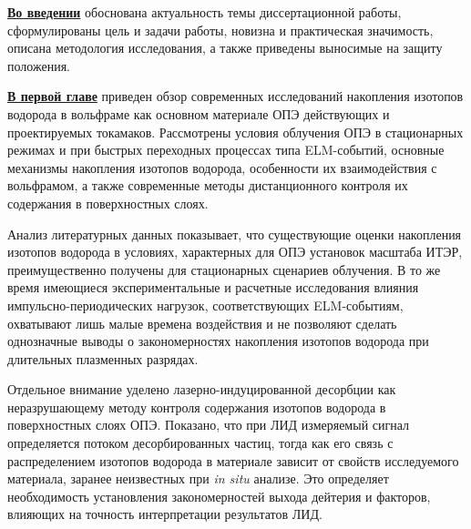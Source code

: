 \underline{\textbf{Во введении}} обоснована актуальность темы диссертационной работы, сформулированы цель и задачи работы, новизна и практическая значимость, описана методология исследования, а также приведены выносимые на защиту положения.

\underline{\textbf{В первой главе}} приведен обзор современных исследований накопления изотопов водорода в вольфраме как основном материале ОПЭ действующих и проектируемых токамаков. Рассмотрены условия облучения ОПЭ в стационарных режимах и при быстрых переходных процессах типа ELM-событий, основные механизмы накопления изотопов водорода, особенности их взаимодействия с вольфрамом, а также современные методы дистанционного контроля их содержания в поверхностных слоях.

Анализ литературных данных показывает, что существующие оценки накопления изотопов водорода в условиях, характерных для ОПЭ установок масштаба ИТЭР, преимущественно получены для стационарных сценариев облучения. В то же время имеющиеся экспериментальные и расчетные исследования влияния импульсно-периодических нагрузок, соответствующих ELM-событиям, охватывают лишь малые времена воздействия и не позволяют сделать однозначные выводы о закономерностях накопления изотопов водорода при длительных плазменных разрядах.

Отдельное внимание уделено лазерно-индуцированной десорбции как неразрушающему методу контроля содержания изотопов водорода в поверхностных слоях ОПЭ. Показано, что при ЛИД измеряемый сигнал определяется потоком десорбированных частиц, тогда как его связь с распределением изотопов водорода в материале зависит от свойств исследуемого материала, заранее неизвестных при \textit{in situ} анализе. Это определяет необходимость установления закономерностей выхода дейтерия и факторов, влияющих на точность интерпретации результатов ЛИД.

